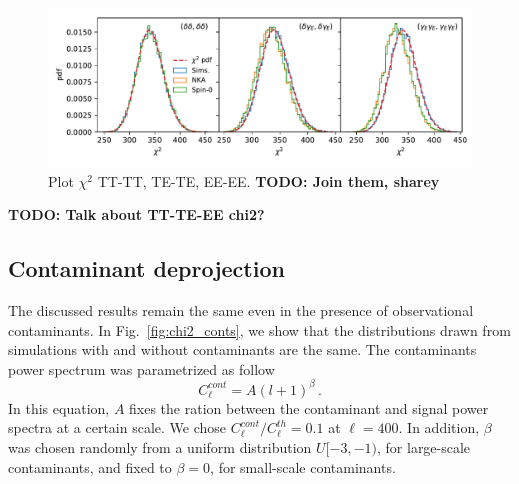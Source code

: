 \documentclass[a4paper,11pt]{article}
\newcommand{\todo}[1]{{\bf TODO: #1}}
\newcommand{\clth}{C_\ell^{th}}
\newcommand{\clc}{C_\ell^{cont}}
\begin{document}
      \begin{figure}[htb]
        \centering
        \includegraphics[width=\textwidth]{./figures/run_sph_2b_1stbin_chi2_TT_TE_EE.pdf}
        \caption{Plot $\chi^2$ TT-TT, TE-TE, EE-EE. \todo{Join them, sharey}} \label{fig:chi2_1bin}
      \end{figure}

      \todo{Talk about TT-TE-EE chi2?}

    \subsection{Contaminant deprojection}\label{ssec:results.deproj}
      The discussed results remain the same even in the presence of observational contaminants. In Fig.~\ref{fig:chi2_conts}, we show that the distributions drawn from simulations with and without contaminants are the same. The contaminants power spectrum was parametrized as follow
      \begin{equation}
        \clc = A (l + 1)^{\beta}\,.
        \label{eq:conts}
      \end{equation}
      In this equation, $A$ fixes the ration between the contaminant and signal power spectra at a certain scale. We chose $\clc/\clth = 0.1$ at $\ell=400$. In addition, $\beta$ was chosen randomly from a uniform distribution $U[-3,-1)$, for large-scale contaminants, and fixed to $\beta=0$, for small-scale contaminants. 
\end{document}
